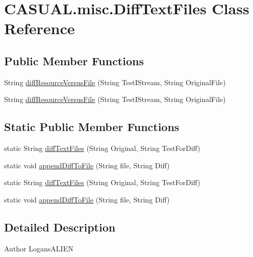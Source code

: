\hypertarget{class_c_a_s_u_a_l_1_1misc_1_1_diff_text_files}{\section{C\-A\-S\-U\-A\-L.\-misc.\-Diff\-Text\-Files Class Reference}
\label{class_c_a_s_u_a_l_1_1misc_1_1_diff_text_files}
}
\subsection*{Public Member Functions}
\begin{DoxyCompactItemize}
\item 
String \hyperlink{class_c_a_s_u_a_l_1_1misc_1_1_diff_text_files_a7eb69fa4b7c445f249e91417d8d5b650}{diff\-Resource\-Versus\-File} (String Test\-I\-Stream, String Original\-File)
\item 
String \hyperlink{class_c_a_s_u_a_l_1_1misc_1_1_diff_text_files_a7eb69fa4b7c445f249e91417d8d5b650}{diff\-Resource\-Versus\-File} (String Test\-I\-Stream, String Original\-File)
\end{DoxyCompactItemize}
\subsection*{Static Public Member Functions}
\begin{DoxyCompactItemize}
\item 
static String \hyperlink{class_c_a_s_u_a_l_1_1misc_1_1_diff_text_files_a71781c42fbe44f9486615634873b1df4}{diff\-Text\-Files} (String Original, String Test\-For\-Diff)
\item 
static void \hyperlink{class_c_a_s_u_a_l_1_1misc_1_1_diff_text_files_af92d2e5442e3114f04c303d12fc3dde4}{append\-Diff\-To\-File} (String file, String Diff)
\item 
static String \hyperlink{class_c_a_s_u_a_l_1_1misc_1_1_diff_text_files_a71781c42fbe44f9486615634873b1df4}{diff\-Text\-Files} (String Original, String Test\-For\-Diff)
\item 
static void \hyperlink{class_c_a_s_u_a_l_1_1misc_1_1_diff_text_files_af92d2e5442e3114f04c303d12fc3dde4}{append\-Diff\-To\-File} (String file, String Diff)
\end{DoxyCompactItemize}


\subsection{Detailed Description}
\begin{DoxyAuthor}{Author}
Logans\-A\-L\-I\-E\-N 
\end{DoxyAuthor}


